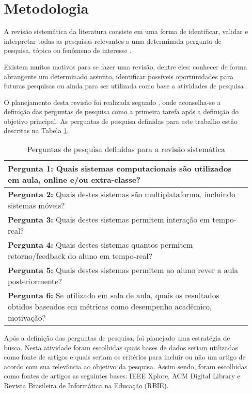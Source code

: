 \section{Metodologia}

A revisão sistemática da literatura consiste em uma forma de identificar, validar e interpretar todas as pesquisas relevantes a uma determinada pergunta de pesquisa, tópico ou fenômeno de interesse \cite{kitchenham:2004}. 

Existem muitos motivos para se fazer uma revisão, dentre eles: conhecer de forma abrangente um determinado assunto, identificar possíveis oportunidades para futuras pesquisas ou ainda para ser utilizada como base a atividades de pesquisa \cite{kitchenham:2004}. 

O planejamento desta revisão foi realizada segundo \cite{kitchenham:2004}, onde aconselha-se a definição das perguntas de pesquisa como a primeira tarefa após a definição do objetivo principal. As perguntas de pesquisa definidas para este trabalho estão descritas na Tabela \ref{tab:perguntas}.

\bgroup
\def\arraystretch{1.5} %
\begin{table}[h]{} %
\centering
\begin{tabular}{|p{14cm}|} \hline
\textbf{Pergunta 1:} Quais sistemas computacionais são utilizados em aula, online e/ou extra-classe? \\ \hline
\textbf{Pergunta 2:} Quais destes sistemas são multiplataforma, incluindo sistemas móveis? \\ \hline
\textbf{Pergunta 3:} Quais destes sistemas permitem interação em tempo-real? \\ \hline
\textbf{Pergunta 4:} Quais destes sistemas quantos permitem retorno/feedback do aluno em tempo-real? \\ \hline
\textbf{Pergunta 5:} Quais destes sistemas permitem ao aluno rever a aula posteriormente? \\ \hline
\textbf{Pergunta 6:} Se utilizado em sala de aula, quais os resultados obtidos baseados em métricas como desempenho acadêmico, motivação? \\ \hline
\end{tabular}
\caption{Perguntas de pesquisa definidas para a revisão sistemática}
\label{tab:perguntas}
\end{table}
\egroup


Após a definição das perguntas de pesquisa, foi planejado uma estratégia de busca. Nesta atividade foram escolhidas quais bases de dados seriam utilizadas como fonte de artigos e quais seriam os critérios para incluir ou não um artigo de acordo com sua relevância ao objetivo da pesquisa. Assim sendo, foram escolhidas como fontes de artigos as seguintes bases: IEEE Xplore, ACM Digital Library e Revista Brasileira de Informática na Educação (RBIE).

